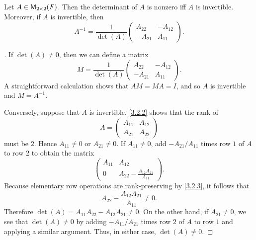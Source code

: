 \begin{thm}\label{4.2}
	Let \(A \in \ms[2][2][\F]\).
	Then the determinant of \(A\) is nonzero iff \(A\) is invertible.
	Moreover, if \(A\) is invertible, then
	\[
		A^{-1} = \frac{1}{\det(A)} \begin{pmatrix}
			A_{2 2}  & -A_{1 2} \\
			-A_{2 1} & A_{1 1}
		\end{pmatrix}.
	\]
\end{thm}

\begin{proof}[]
	If \(\det(A) \neq 0\), then we can define a matrix
	\[
		M = \frac{1}{\det(A)} \begin{pmatrix}
			A_{2 2}  & -A_{1 2} \\
			-A_{2 1} & A_{1 1}
		\end{pmatrix}.
	\]
	A straightforward calculation shows that \(AM = MA = I\), and so \(A\) is invertible and \(M = A^{-1}\).

	Conversely, suppose that \(A\) is invertible.
	\cref{3.2.2} shows that the rank of
	\[
		A = \begin{pmatrix}
			A_{1 1} & A_{1 2} \\
			A_{2 1} & A_{2 2}
		\end{pmatrix}
	\]
	must be \(2\).
	Hence \(A_{1 1} \neq 0\) or \(A_{2 1} \neq 0\).
	If \(A_{1 1} \neq 0\), add \(-A_{2 1} / A_{1 1}\) times row \(1\) of \(A\) to row \(2\) to obtain the matrix
	\[
		\begin{pmatrix}
			A_{1 1} & A_{1 2}                                   \\
			0       & A_{2 2} - \frac{A_{1 2} A_{2 1}}{A_{1 1}}
		\end{pmatrix}.
	\]
	Because elementary row operations are rank-preserving by \cref{3.2.3}, it follows that
	\[
		A_{2 2} - \frac{A_{1 2} A_{2 1}}{A_{1 1}} \neq 0.
	\]
	Therefore \(\det(A) = A_{1 1} A_{2 2} - A_{1 2} A_{2 1} \neq 0\).
	On the other hand, if \(A_{2 1} \neq 0\), we see that \(\det(A) \neq 0\) by adding \(-A_{1 1} / A_{2 1}\) times row \(2\) of \(A\) to row \(1\) and applying a similar argument.
	Thus, in either case, \(\det(A) \neq 0\).
\end{proof}

